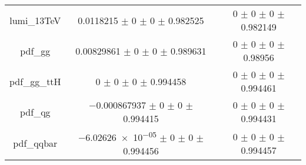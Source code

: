 \begin{table}
\begin{tabular}{ccc}
lumi\_13TeV & \num{0.0118215} $\pm$ \num{0} $\pm$ \num{0} $\pm$ \num{0.982525} & \num{0} $\pm$ \num{0} $\pm$ \num{0} $\pm$ \num{0.982149}\\
pdf\_gg & \num{0.00829861} $\pm$ \num{0} $\pm$ \num{0} $\pm$ \num{0.989631} & \num{0} $\pm$ \num{0} $\pm$ \num{0} $\pm$ \num{0.98956}\\
pdf\_gg\_ttH & \num{0} $\pm$ \num{0} $\pm$ \num{0} $\pm$ \num{0.994458} & \num{0} $\pm$ \num{0} $\pm$ \num{0} $\pm$ \num{0.994461}\\
pdf\_qg & \num{-0.000867937} $\pm$ \num{0} $\pm$ \num{0} $\pm$ \num{0.994415} & \num{0} $\pm$ \num{0} $\pm$ \num{0} $\pm$ \num{0.994431}\\
pdf\_qqbar & \num{-6.02626e-05} $\pm$ \num{0} $\pm$ \num{0} $\pm$ \num{0.994456} & \num{0} $\pm$ \num{0} $\pm$ \num{0} $\pm$ \num{0.994457}\\
\bottomrule
\end{tabular}
\end{table}